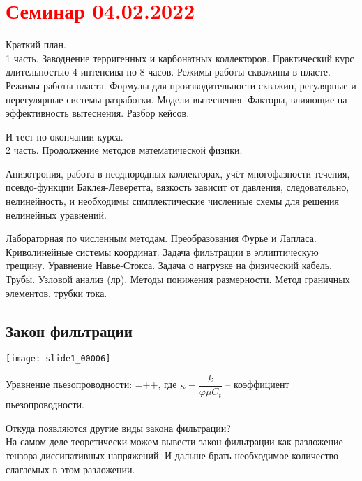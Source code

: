 \documentclass[main.tex]{subfiles}
\begin{document}
\section{\textcolor{red}{Семинар 04.02.2022}}

Краткий план.\\

1 часть. Заводнение терригенных и карбонатных коллекторов. Практический курс длительностью 4 интенсива по 8 часов. Режимы работы скважины в пласте. Режимы работы пласта. Формулы для производительности скважин, регулярные и нерегулярные системы разработки. Модели вытеснения. Факторы, влияющие на эффективность вытеснения. Разбор кейсов.

И тест по окончании курса.\\

2 часть. Продолжение методов математической физики.

Анизотропия, работа в неоднородных коллекторах, учёт многофазности течения, псевдо-функции Баклея-Леверетта, вязкость зависит от давления, следовательно, нелинейность, и необходимы симплектические численные схемы для решения нелинейных уравнений.

Лабораторная по численным методам. Преобразования Фурье и Лапласа. Криволинейные системы координат. Задача фильтрации в эллиптическую трещину. Уравнение Навье-Стокса. Задача о нагрузке на физический кабель. Трубы. Узловой анализ (лр). Методы понижения размерности. Метод граничных элементов, трубки тока.



\subsection{Закон фильтрации}
\texttt{[image: slide1\_00006]}

Уравнение пьезопроводности:
\beq
{}=++,
\eeq
где $\kappa=\dfrac{k}{\varphi\mu C_t}$ -- коэффициент пьезопроводности.


Откуда появляются другие виды закона фильтрации?\\

На самом деле теоретически можем вывести закон фильтрации как разложение тензора диссипативных напряжений. И дальше брать необходимое количество слагаемых в этом разложении.\\
\end{document}
